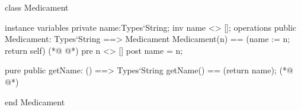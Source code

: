 \begin{vdmpp}[breaklines=true]
class Medicament

instance variables
  private name:Types`String;
  inv name <> [];
operations
 public Medicament: Types`String ==> Medicament
  Medicament(n) == (name := n; return self)
(*@
\label{Medicament:9}
@*)
 pre n <> []
 post name = n;
 
 pure public getName: () ==> Types`String
  getName() == (return name);
(*@
\label{getName:14}
@*)

end Medicament
\end{vdmpp}
